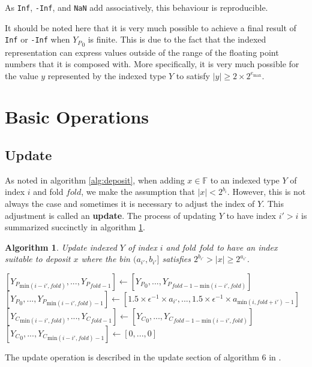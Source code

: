 \documentclass[12pt]{article}
\providecommand{\F}{\ensuremath{\mathbb{F}}}
\providecommand{\min}{\ensuremath{\text{min}}}
\providecommand{\max}{\ensuremath{\text{max}}}
\theoremstyle{plain}
\newtheorem{alg}{Algorithm}[section]
\begin{document}
      As \verb|Inf|, \verb|-Inf|, and \verb|NaN| add associatively, this behaviour is reproducible.

      It should be noted here that it is very much possible to achieve a final result of \verb|Inf| or \verb|-Inf| when ${Y_P}_0$ is finite. This is due to the fact that the indexed representation can express values outside of the range of the floating point numbers that it is composed with. More specifically, it is very much possible for the value $y$ represented by the indexed type $Y$ to satisfy $|y| \geq 2 \times 2^{e_{\max}}$.

\section{Basic Operations}
  \subsection{Update}
    As noted in algorithm \ref{alg:deposit}, when adding $x \in \F$ to an indexed type $Y$ of index $i$ and fold $fold$, we make the assumption that $|x| < 2^{b_i}$. However, this is not always the case and sometimes it is necessary to adjust the index of $Y$. This adjustment is called an \textbf{update}. The process of updating $Y$ to have index $i' > i$ is summarized succinctly in algorithm \ref{alg:update}.
    \begin{alg}
      Update indexed $Y$ of index $i$ and fold $fold$ to have an index suitable to deposit $x$ where the bin $(a_{i'}, b_{i'}]$ satisfies $2^{b_{i'}} > |x| \geq 2^{a_{i'}}$.
      \begin{algorithmic}
            \State $[{Y_P}_{\min(i - i', fold)}, ..., {Y_P}_{fold - 1}] \gets [{Y_P}_0, ..., {Y_P}_{fold - 1 - \min(i - i', fold)}]$
            \State $[{Y_P}_0, ..., {Y_P}_{\min(i - i', fold) - 1}] \gets [1.5 \times \epsilon^{-1} \times a_{i'}, ..., 1.5 \times \epsilon^{-1} \times a_{\min(i, fold + i') - 1}]$
            \State $[{Y_C}_{\min(i - i', fold)}, ..., {Y_C}_{fold - 1}] \gets [{Y_C}_0, ..., {Y_C}_{fold - 1 - \min(i - i', fold)}]$
            \State $[{Y_C}_0, ..., {Y_C}_{\min(i - i', fold) - 1}] \gets [0, ..., 0]$
          \EndIf
        \EndFunction
      \end{algorithmic}
      \label{alg:update}
    \end{alg}
    The update operation is described in the update section of algorithm $6$ in \cite{repsum}.
\end{document}
